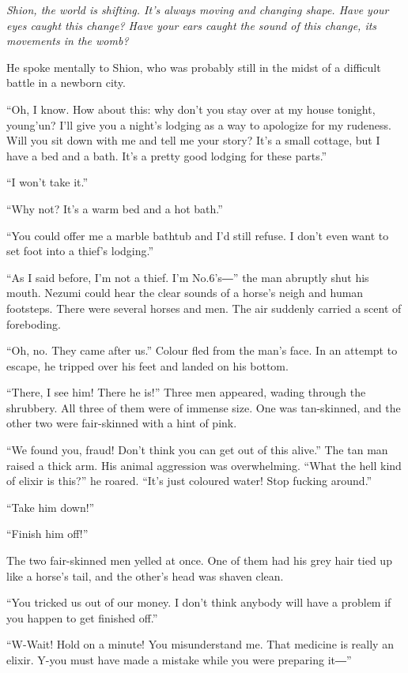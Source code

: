 \emph{Shion, the world is shifting. It's always moving and changing shape.
Have your eyes caught this change? Have your ears caught the sound of
this change, its movements in the womb?}

He spoke mentally to Shion, who was probably still in the midst of a
difficult battle in a newborn city.

``Oh, I know. How about this: why don't you stay over at my house
tonight, young'un? I'll give you a night's lodging as a way to apologize
for my rudeness. Will you sit down with me and tell me your story? It's
a small cottage, but I have a bed and a bath. It's a pretty good lodging
for these parts.''

``I won't take it.''

``Why not? It's a warm bed and a hot bath.''

``You could offer me a marble bathtub and I'd still refuse. I don't even
want to set foot into a thief's lodging.''

``As I said before, I'm not a thief. I'm No.6's―'' the man abruptly shut
his mouth. Nezumi could hear the clear sounds of a horse's neigh and
human footsteps. There were several horses and men. The air suddenly
carried a scent of foreboding.

``Oh, no. They came after us.'' Colour fled from the man's face. In an
attempt to escape, he tripped over his feet and landed on his bottom.

``There, I see him! There he is!'' Three men appeared, wading through
the shrubbery. All three of them were of immense size. One was
tan-skinned, and the other two were fair-skinned with a hint of pink.

``We found you, fraud! Don't think you can get out of this alive.'' The
tan man raised a thick arm. His animal aggression was overwhelming.
``What the hell kind of elixir is this?'' he roared. ``It's just
coloured water! Stop fucking around.''

``Take him down!''

``Finish him off!''

The two fair-skinned men yelled at once. One of them had his grey hair
tied up like a horse's tail, and the other's head was shaven clean.

``You tricked us out of our money. I don't think anybody will have a
problem if you happen to get finished off.''

``W-Wait! Hold on a minute! You misunderstand me. That medicine is
really an elixir. Y-you must have made a mistake while you were
preparing it―''

